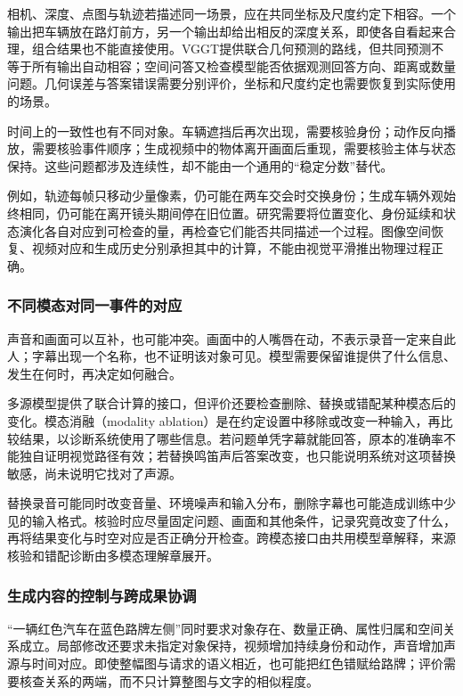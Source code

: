 相机、深度、点图与轨迹若描述同一场景，应在共同坐标及尺度约定下相容。一个输出把车辆放在路灯前方，另一个输出却给出相反的深度关系，即使各自看起来合理，组合结果也不能直接使用。VGGT提供联合几何预测的路线，但共同预测不等于所有输出自动相容；空间问答又检查模型能否依据观测回答方向、距离或数量问题。几何误差与答案错误需要分别评价，坐标和尺度约定也需要恢复到实际使用的场景。

时间上的一致性也有不同对象。车辆遮挡后再次出现，需要核验身份；动作反向播放，需要核验事件顺序；生成视频中的物体离开画面后重现，需要核验主体与状态保持。这些问题都涉及连续性，却不能由一个通用的“稳定分数”替代。

例如，轨迹每帧只移动少量像素，仍可能在两车交会时交换身份；生成车辆外观始终相同，仍可能在离开镜头期间停在旧位置。研究需要将位置变化、身份延续和状态演化各自对应到可检查的量，再检查它们能否共同描述一个过程。图像空间恢复、视频对应和生成历史分别承担其中的计算，不能由视觉平滑推出物理过程正确。

\subsubsection{不同模态对同一事件的对应}
\label{sec:vision-overview-alignment-frontier}

声音和画面可以互补，也可能冲突。画面中的人嘴唇在动，不表示录音一定来自此人；字幕出现一个名称，也不证明该对象可见。模型需要保留谁提供了什么信息、发生在何时，再决定如何融合。

多源模型提供了联合计算的接口，但评价还要检查删除、替换或错配某种模态后的变化。模态消融（modality ablation）是在约定设置中移除或改变一种输入，再比较结果，以诊断系统使用了哪些信息。若问题单凭字幕就能回答，原本的准确率不能独自证明视觉路径有效；若替换鸣笛声后答案改变，也只能说明系统对这项替换敏感，尚未说明它找对了声源。

替换录音可能同时改变音量、环境噪声和输入分布，删除字幕也可能造成训练中少见的输入格式。核验时应尽量固定问题、画面和其他条件，记录究竟改变了什么，再将结果变化与时空对应是否正确分开检查。跨模态接口由共用模型章解释，来源核验和错配诊断由多模态理解章展开。

\subsubsection{生成内容的控制与跨成果协调}
\label{sec:vision-overview-generation-frontier}

“一辆红色汽车在蓝色路牌左侧”同时要求对象存在、数量正确、属性归属和空间关系成立。局部修改还要求未指定对象保持，视频增加持续身份和动作，声音增加声源与时间对应。即使整幅图与请求的语义相近，也可能把红色错赋给路牌；评价需要核查关系的两端，而不只计算整图与文字的相似程度。

